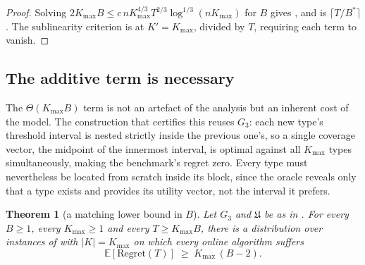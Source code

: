 \documentclass[letterpaper,9pt,twocolumn]{extarticle}
\newcommand{\EE}{\mathbb{E}}
\newcommand{\Kmax}{K_{\max}}
\newcommand{\Univ}{\mathfrak{U}}
\newcommand{\Regret}{\mathrm{Regret}}
\theoremstyle{plain}
\newtheorem{theorem}{Theorem}
\theoremstyle{definition}
\theoremstyle{remark}
\begin{document}
\begin{proof}
Solving $2\Kmax B\le c\,n\Kmax^{4/3}T^{2/3}\log^{1/3}(n\Kmax)$ for $B$
gives , and  is $\lceil T/B^{*}\rceil$.
The sublinearity criterion is  at $K'=\Kmax$,
divided by $T$, requiring each term to vanish.
\end{proof}

\subsection{The additive term is necessary}

The $\Theta(\Kmax B)$ term is not an artefact of the analysis but an
inherent cost of the model. The construction that certifies this reuses
$G_3$: each new type's threshold interval is nested strictly inside the
previous one's, so a single coverage vector, the midpoint of the
innermost interval, is optimal against all $\Kmax$ types
simultaneously, making the benchmark's regret zero. Every type must
nevertheless be located from scratch inside its block, since the oracle
reveals only that a type exists and provides its utility vector, not the
interval it prefers.

\begin{theorem}[a matching lower bound in $B$]
\label{thm:blocklb}
Let $G_3$ and $\Univ$ be as in . For every $B\ge 1$,
every $\Kmax\ge 1$ and every $T\ge \Kmax B$, there is a distribution over
instances of  with $|K|=\Kmax$ on which every online
algorithm suffers
\begin{equation}
\EE[\Regret(T)]\;\ge\;\Kmax\,(B-2).
\label{eq:blocklb}
\end{equation}
\end{theorem}
\end{document}
